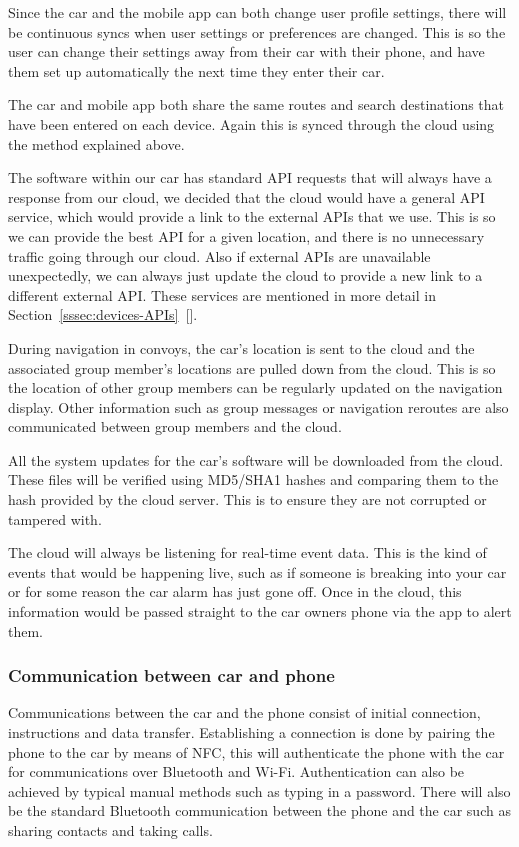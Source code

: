 \documentclass{article}
\begin{document}
Since the car and the mobile app can both change user profile settings, there will be continuous syncs when user settings or preferences are changed. This is so the user can change their settings away from their car with their phone, and have them set up automatically the next time they enter their car.

The car and mobile app both share the same routes and search destinations that have been entered on each device. Again this is synced through the cloud using the method explained above.

The software within our car has standard API requests that will always have a response from our cloud, we decided that the cloud would have a general API service, which would provide a link to the external APIs that we use. This is so we can provide the best API for a given location, and there is no unnecessary traffic going through our cloud. Also if external APIs are unavailable unexpectedly, we can always just update the cloud to provide a new link to a different external API\@. These services are mentioned in more detail in Section~\ref{sssec:devices-APIs}~[].

During navigation in convoys, the car's location is sent to the cloud and the associated group member's locations are pulled down from the cloud. This is so the location of other group members can be regularly updated on the navigation display. Other information such as group messages or navigation reroutes are also communicated between group members and the cloud.

All the system updates for the car's software will be downloaded from the cloud. These files will be verified using MD5/SHA1 hashes and comparing them to the hash provided by the cloud server. This is to ensure they are not corrupted or tampered with.

The cloud will always be listening for real-time event data. This is the kind of events that would be happening live, such as if someone is breaking into your car or for some reason the car alarm has just gone off. Once in the cloud, this information would be passed straight to the car owners phone via the app to alert them.

\subsubsection{Communication between car and phone}\label{sssec:car-phone}
Communications between the car and the phone consist of initial connection, instructions and data transfer. Establishing a connection is done by pairing the phone to the car by means of NFC, this will authenticate the phone with the car for communications over Bluetooth and Wi-Fi. Authentication can also be achieved by typical manual methods such as typing in a password. There will also be the standard Bluetooth communication between the phone and the car such as sharing contacts and taking calls.
\end{document}
